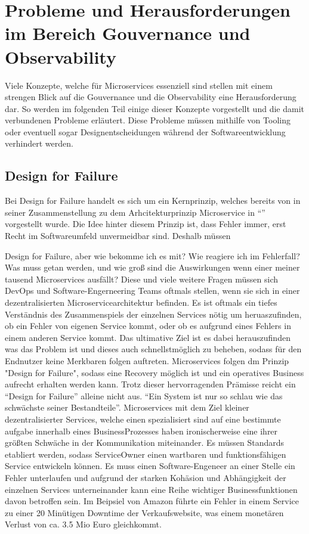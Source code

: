 \section{Probleme und Herausforderungen im Bereich Gouvernance und Observability}

Viele Konzepte, welche für Microservices essenziell sind stellen mit einem strengen Blick auf die Gouvernance und die Observability eine Herausforderung dar. So werden im folgenden Teil einige dieser Konzepte vorgestellt und die damit verbundenen Probleme erläutert. Diese Probleme müssen mithilfe von Tooling oder eventuell sogar Designentscheidungen während der Softwareentwicklung verhindert werden.

\subsection{Design for Failure \autocite{FowlerMicrservices}}
Bei Design for Failure handelt es sich um ein Kernprinzip, welches bereits von \citeauthor{FowlerMicrservices} in seiner Zusammenstellung zu dem Arhcitekturprinzip Microservice in \enquote{} vorgestellt wurde. Die Idee hinter diesem Prinzip ist, dass Fehler immer, erst Recht im Softwareumfeld unvermeidbar sind. Deshalb müssen 


Design for Failure, aber wie bekomme ich es mit? Wie reagiere ich im Fehlerfall? Was muss getan werden, und wie groß sind die Auswirkungen wenn einer meiner tausend Microservices ausfällt? Diese und viele weitere Fragen müssen sich DevOps und Software-Engerneering Teams oftmals stellen, wenn sie sich in einer dezentralisierten Microservicearchitektur befinden. Es ist oftmals ein tiefes Verständnis des Zusammenspiels der einzelnen Services nötig um heruaszufinden, ob ein Fehler von eigenen Service kommt, oder ob es aufgrund eines Fehlers in einem anderen Service kommt. Das ultimative Ziel ist es dabei herauszufinden was das Problem ist und dieses auch schnellstmöglich zu beheben, sodass für den Endnutzer keine Merkbaren folgen auftreten. Microservices folgen dm Prinzip "Design for Failure", sodass eine Recovery möglich ist und ein operatives Business aufrecht erhalten werden kann. Trotz dieser hervorragenden Prämisse reicht ein \enquote{Design for Failure} alleine nicht aus. \enquote{Ein System ist nur so schlau wie das schwächste seiner Bestandteile}. Microservices mit dem Ziel kleiner dezentralisierter Services, welche einen spezialisiert sind auf eine bestimmte aufgabe innerhalb eines BusinessProzesses haben ironischerweise eine ihrer größten Schwäche in der Kommunikation miteinander. Es müssen Standards etabliert werden, sodass ServiceOwner einen wartbaren und funktionsfähigen Service entwickeln können. Es muss einen Software-Engeneer an einer Stelle ein Fehler unterlaufen und aufgrund der starken Kohäsion und Abhängigkeit der einzelnen Services unterneinander kann eine Reihe wichtiger Businessfunktionen davon betroffen sein. Im Beipsiel von Amazon führte ein Fehler in einem Service zu einer 20 Minütigen Downtime der Verkaufswebsite, was einem monetären Verlust von ca. 3.5 Mio Euro gleichkommt.

